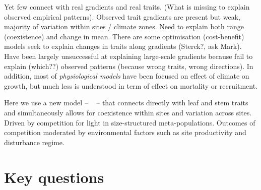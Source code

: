 \documentclass[a4paper,11pt]{article}
\begin{document}
Yet few connect with real gradients and real traits.    (What is missing to explain observed empirical patterns). Observed trait gradients are present but weak, majority of variation within sites / climate zones. Need to explain both range (coexistence) and change in mean. There are some optimisation (cost-benefit) models seek to explain changes in traits along gradients  (Sterck?, ask Mark). Have been largely unsuccessful at explaining large-scale gradients because fail to explain (which??) observed patterns (because wrong traits, wrong directions).
In addition, most of \textit{physiological models} have been focused on effect of climate on growth, but much less is understood in term of effect on mortality or recruitment.

Here we use a new model -- \plant\ \citep{Falster-2016} -- that connects directly with leaf and stem traits and simultaneously allows for coexistence within sites and variation across sites.  Driven by competition for light in size-structured meta-populations. Outcomes of competition moderated by environmental factors such as site productivity and disturbance regime.

\section{Key questions}
\end{document}
